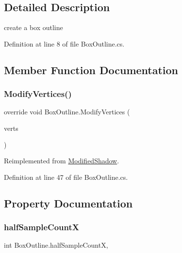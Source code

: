 \subsection{Detailed Description}
create a box outline 



Definition at line 8 of file Box\+Outline.\+cs.



\subsection{Member Function Documentation}
\mbox{\label{class_box_outline_a2f73aa9d45a23d039aeff7a33a322019}} 
\subsubsection{\texorpdfstring{Modify\+Vertices()}{ModifyVertices()}}
{\footnotesize\ttfamily override void Box\+Outline.\+Modify\+Vertices (\begin{DoxyParamCaption}\item[{List$<$ U\+I\+Vertex $>$}]{verts }\end{DoxyParamCaption})\hspace{0.3cm}{\ttfamily [virtual]}}



Reimplemented from \mbox{\hyperlink{class_modified_shadow_ac1651effd229c1fd2f454eccc2cf225c}{Modified\+Shadow}}.



Definition at line 47 of file Box\+Outline.\+cs.



\subsection{Property Documentation}
\mbox{\label{class_box_outline_a7a2b303e8572fffaf5384730964de22c}} 
\subsubsection{\texorpdfstring{half\+Sample\+CountX}{halfSampleCountX}}
{\footnotesize\ttfamily int Box\+Outline.\+half\+Sample\+CountX\hspace{0.3cm}{\ttfamily [get]}, {\ttfamily [set]}}



